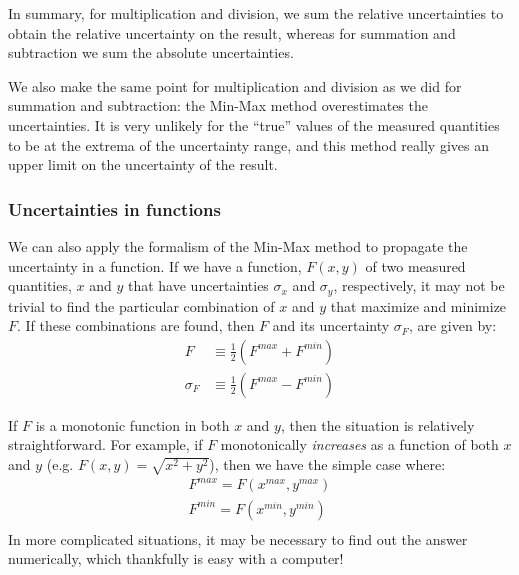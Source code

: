 In summary, for multiplication and division, we sum the relative uncertainties to obtain the relative uncertainty on the result, whereas for summation and subtraction we sum the absolute uncertainties.

We also make the same point for multiplication and division as we did for summation and subtraction: the Min-Max method overestimates the uncertainties. It is very unlikely for the ``true'' values of the measured quantities to be at the extrema of the uncertainty range, and this method really gives an upper limit on the uncertainty of the result.

\subsubsection{Uncertainties in functions}
We can also apply the formalism of the Min-Max method to propagate the uncertainty in a function. If we have a function, $F(x,y)$ of two measured quantities, $x$ and $y$ that have uncertainties $\sigma_{x}$ and $\sigma_{y}$, respectively, it may not be trivial to find the particular combination of $x$ and $y$ that maximize and minimize $F$. If these combinations are found, then $F$ and its uncertainty $\sigma_{F}$, are given by:
\begin{align}
F&\equiv\frac{1}{2}(F^{max}+F^{min})\nonumber\\
\sigma_{F}&\equiv\frac{1}{2}(F^{max}-F^{min})
\end{align}

If $F$ is a monotonic function in both $x$ and $y$, then the situation is relatively straightforward. For example, if $F$ monotonically \textit{increases} as a function of both $x$ and $y$ (e.g. $F(x,y)=\sqrt{x^2+y^2}$), then we have the simple case where:
\begin{align*}
F^{max}=F(x^{max},y^{max})\\
F^{min}=F(x^{min},y^{min})\\
\end{align*}
In more complicated situations, it may be necessary to find out the answer numerically, which thankfully is easy with a computer!

